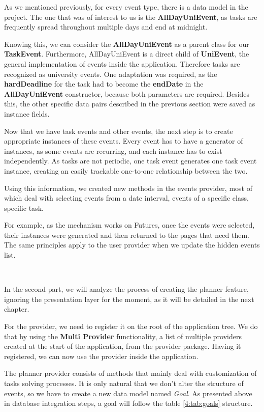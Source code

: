 As we mentioned previously, for every event type, there is a data model in the project. The one that was of interest to us is the \textbf{AllDayUniEvent}, as tasks are frequently spread throughout multiple days and end at midnight. 

Knowing this, we can consider the \textbf{AllDayUniEvent} as a parent class for our \textbf{TaskEvent}. Furthermore, AllDayUniEvent is a direct child of \textbf{UniEvent}, the general implementation of events inside the application. Therefore tasks are recognized as university events. One adaptation was required, as the \textbf{hardDeadline} for the task had to become the \textbf{endDate} in the \textbf{AllDayUniEvent} constructor, because both parameters are required. Besides this, the other specific data pairs described in the previous section were saved as instance fields.

Now that we have task events and other events, the next step is to create appropriate instances of these events. Every event has to have a generator of instances, as some events are recurring, and each instance has to exist independently. As tasks are not periodic, one task event generates one task event instance, creating an easily trackable one-to-one relationship between the two. 

Using this information, we created new methods in the events provider, most of which deal with selecting events from a date interval, events of a specific class, specific task. 

For example, as the mechanism works on Futures, once the events were selected, their instances were generated and then returned to the pages that need them. 
The same principles apply to the user provider when we update the hidden events list.

~

In the second part, we will analyze the process of creating the planner feature, ignoring the presentation layer for the moment, as it will be detailed in the next chapter. 

For the provider, we need to register it on the root of the application tree. We do that by using the \textbf{Multi Provider} functionality,  a list of multiple providers created at the start of the application, from the provider package. Having it registered, we can now use the provider inside the application.

The planner provider consists of methods that mainly deal with customization of tasks solving processes. It is only natural that we don’t alter the structure of events, so we have to create a new data model named \textit{Goal}. As presented above in database integration steps, a goal will follow the table \ref{4:tab:goals} structure.

